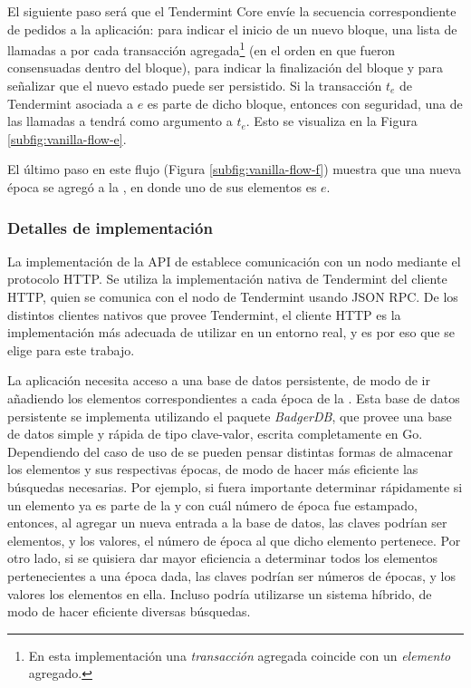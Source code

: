 %
El siguiente paso será que el Tendermint Core envíe
la secuencia correspondiente de pedidos a la aplicación: \BeginBlock para indicar el inicio de
un nuevo bloque,
una lista de llamadas a \DeliverTx por cada transacción agregada\footnote{En esta implementación
una \textit{transacción} agregada coincide con un \textit{elemento} agregado.} (en el orden en que fueron
consensuadas dentro del bloque),
\EndBlock para indicar la finalización del bloque y \Commit para señalizar que el nuevo estado
puede ser persistido.
%
Si la transacción $t_e$ de Tendermint asociada a $e$ es parte de dicho bloque,
entonces con seguridad, una de las llamadas a \DeliverTx tendrá como argumento a $t_e$.
Esto se visualiza en la Figura \ref{subfig:vanilla-flow-e}.

%
El último paso en este flujo (Figura \ref{subfig:vanilla-flow-f}) muestra que una nueva época se agregó a la \setchain,
en donde uno de sus elementos es $e$.

\subsubsection{Detalles de implementación}\label{subsubsec:vanilla-implementantion}
La implementación de la API de \setchain establece comunicación con un nodo mediante el protocolo HTTP.
%
Se utiliza la implementación nativa de Tendermint del cliente HTTP,
quien se comunica con el nodo de Tendermint usando JSON RPC.
%
De los distintos clientes nativos que provee Tendermint, el cliente HTTP
es la implementación más adecuada de utilizar en un entorno
real, y es por eso que se elige para este trabajo.

La aplicación necesita acceso a una base de datos persistente, de modo de ir añadiendo
los elementos correspondientes a cada época de la \setchain.
%
Esta base de datos persistente se implementa utilizando el paquete \textit{BadgerDB}\cite{db.badger},
que provee una base de datos simple y rápida de tipo clave-valor, escrita completamente en Go.
%
Dependiendo del caso de uso de \setchain se pueden pensar distintas formas de almacenar los elementos y sus
respectivas épocas, de modo de hacer más eficiente las búsquedas necesarias.
%
Por ejemplo, si fuera importante determinar rápidamente si un elemento ya es parte de la \setchain y con cuál número de época
fue estampado, entonces, al agregar un nueva entrada a la base de datos, las claves podrían ser elementos, y los
valores, el número de época al que dicho elemento pertenece.
%
Por otro lado, si se quisiera dar mayor eficiencia a determinar todos los elementos pertenecientes a una época dada,
las claves podrían ser números de épocas, y los valores los elementos en ella.
%
Incluso podría utilizarse un sistema híbrido, de modo de hacer eficiente diversas búsquedas.

